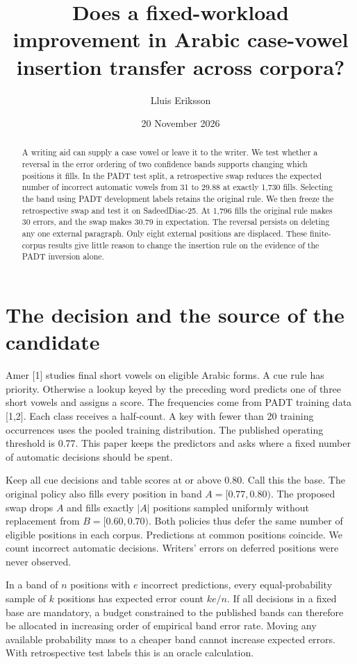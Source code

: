 \documentclass[11pt]{article}
\title{Does a fixed-workload improvement in Arabic case-vowel insertion transfer across corpora?}
\author{Lluis Eriksson}
\date{20 November 2026}
\begin{document}
\maketitle
\begin{abstract}
A writing aid can supply a case vowel or leave it to the writer. We test whether a reversal in the error ordering of two confidence bands supports changing which positions it fills. In the PADT test split, a retrospective swap reduces the expected number of incorrect automatic vowels from 31 to 29.88 at exactly 1,730 fills. Selecting the band using PADT development labels retains the original rule. We then freeze the retrospective swap and test it on SadeedDiac-25. At 1,796 fills the original rule makes 30 errors, and the swap makes 30.79 in expectation. The reversal persists on deleting any one external paragraph. Only eight external positions are displaced. These finite-corpus results give little reason to change the insertion rule on the evidence of the PADT inversion alone.
\end{abstract}

\section{The decision and the source of the candidate}
Amer [1] studies final short vowels on eligible Arabic forms. A cue rule has priority. Otherwise a lookup keyed by the preceding word predicts one of three short vowels and assigns a score. The frequencies come from PADT training data [1,2]. Each class receives a half-count. A key with fewer than 20 training occurrences uses the pooled training distribution. The published operating threshold is 0.77. This paper keeps the predictors and asks where a fixed number of automatic decisions should be spent.

Keep all cue decisions and table scores at or above 0.80. Call this the base. The original policy also fills every position in band \(A=[0.77,0.80)\). The proposed swap drops \(A\) and fills exactly \(|A|\) positions sampled uniformly without replacement from \(B=[0.60,0.70)\). Both policies thus defer the same number of eligible positions in each corpus. Predictions at common positions coincide. We count incorrect automatic decisions. Writers' errors on deferred positions were never observed.

In a band of \(n\) positions with \(e\) incorrect predictions, every equal-probability sample of \(k\) positions has expected error count \(ke/n\). If all decisions in a fixed base are mandatory, a budget constrained to the published bands can therefore be allocated in increasing order of empirical band error rate. Moving any available probability mass to a cheaper band cannot increase expected errors. With retrospective test labels this is an oracle calculation.
\newpage
\end{document}
